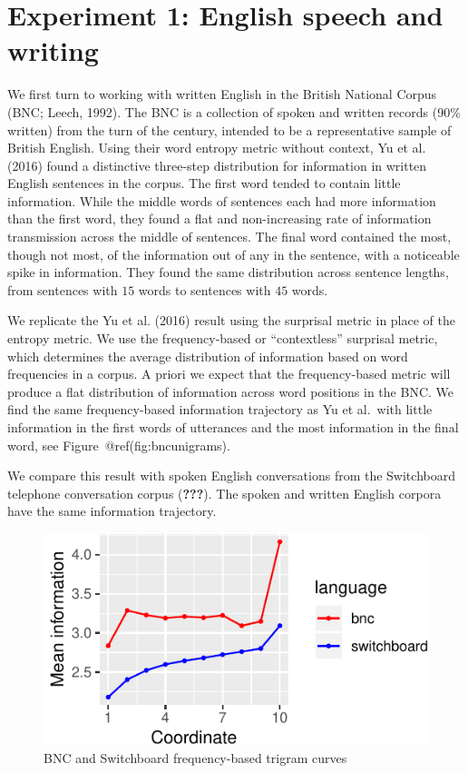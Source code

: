 \documentclass[10pt, letterpaper]{article}
\newenvironment{CodeChunk}{}{}
\begin{document}
\hypertarget{experiment-1-english-speech-and-writing}{%
\section{Experiment 1: English speech and
writing}\label{experiment-1-english-speech-and-writing}}

We first turn to working with written English in the British National
Corpus (BNC; Leech, 1992). The BNC is a collection of spoken and written
records (90\% written) from the turn of the century, intended to be a
representative sample of British English. Using their word entropy
metric without context, Yu et al. (2016) found a distinctive three-step
distribution for information in written English sentences in the corpus.
The first word tended to contain little information. While the middle
words of sentences each had more information than the first word, they
found a flat and non-increasing rate of information transmission across
the middle of sentences. The final word contained the most, though not
most, of the information out of any in the sentence, with a noticeable
spike in information. They found the same distribution across sentence
lengths, from sentences with \(15\) words to sentences with \(45\)
words.

We replicate the Yu et al. (2016) result using the surprisal metric in
place of the entropy metric. We use the frequency-based or
``contextless'' surprisal metric, which determines the average
distribution of information based on word frequencies in a corpus. A
priori we expect that the frequency-based metric will produce a flat
distribution of information across word positions in the BNC. We find
the same frequency-based information trajectory as Yu et al.~with little
information in the first words of utterances and the most information in
the final word, see Figure~@ref(fig:bncunigrams).

We compare this result with spoken English conversations from the
Switchboard telephone conversation corpus ({\textbf{???}}). The spoken
and written English corpora have the same information trajectory.

\begin{CodeChunk}
\begin{figure}[tb]
\includegraphics{figs/bncunigrams-1} \caption[BNC and Switchboard frequency-based trigram curves]{BNC and Switchboard frequency-based trigram curves}\label{fig:bncunigrams}
\end{figure}
\end{CodeChunk}
\end{document}
